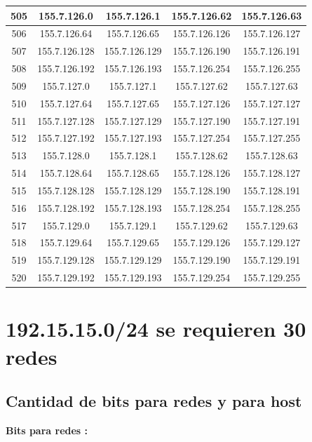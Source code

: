 \documentclass[letterpaper,12pt]{article}
\begin{document}
\begin{longtable}{|c|c|c|c|c|}
        505 & 155.7.126.0 & 155.7.126.1 & 155.7.126.62 & 155.7.126.63 \\ \hline
        506 & 155.7.126.64 & 155.7.126.65 & 155.7.126.126 & 155.7.126.127 \\ \hline
        507 & 155.7.126.128 & 155.7.126.129 & 155.7.126.190 & 155.7.126.191 \\ \hline
        508 & 155.7.126.192 & 155.7.126.193 & 155.7.126.254 & 155.7.126.255 \\ \hline
        509 & 155.7.127.0 & 155.7.127.1 & 155.7.127.62 & 155.7.127.63 \\ \hline
        510 & 155.7.127.64 & 155.7.127.65 & 155.7.127.126 & 155.7.127.127 \\ \hline
        511 & 155.7.127.128 & 155.7.127.129 & 155.7.127.190 & 155.7.127.191 \\ \hline
        512 & 155.7.127.192 & 155.7.127.193 & 155.7.127.254 & 155.7.127.255 \\ \hline
        513 & 155.7.128.0 & 155.7.128.1 & 155.7.128.62 & 155.7.128.63 \\ \hline
        514 & 155.7.128.64 & 155.7.128.65 & 155.7.128.126 & 155.7.128.127 \\ \hline
        515 & 155.7.128.128 & 155.7.128.129 & 155.7.128.190 & 155.7.128.191 \\ \hline
        516 & 155.7.128.192 & 155.7.128.193 & 155.7.128.254 & 155.7.128.255 \\ \hline
        517 & 155.7.129.0 & 155.7.129.1 & 155.7.129.62 & 155.7.129.63 \\ \hline
        518 & 155.7.129.64 & 155.7.129.65 & 155.7.129.126 & 155.7.129.127 \\ \hline
        519 & 155.7.129.128 & 155.7.129.129 & 155.7.129.190 & 155.7.129.191 \\ \hline
        520 & 155.7.129.192 & 155.7.129.193 & 155.7.129.254 & 155.7.129.255 \\ \hline
    \end{longtable}

    \newpage

    \section{192.15.15.0/24 se requieren 30 redes}

    \subsection{Cantidad de bits para redes y para host}
    \textbf{Bits para redes :} \\
    
\end{document}
